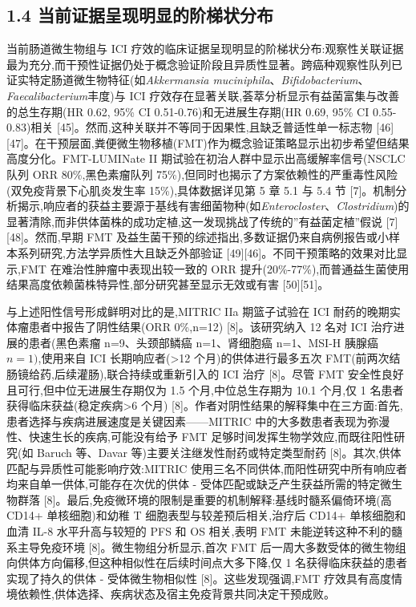 \subsection{1.4 当前证据呈现明显的阶梯状分布}\label{ux5f53ux524dux8bc1ux636eux5448ux73b0ux660eux663eux7684ux9636ux68afux72b6ux5206ux5e03}

当前肠道微生物组与 ICI 疗效的临床证据呈现明显的阶梯状分布:观察性关联证据最为充分,而干预性证据仍处于概念验证阶段且异质性显著。跨癌种观察性队列已证实特定肠道微生物特征(如\emph{Akkermansia muciniphila}、\emph{Bifidobacterium}、\emph{Faecalibacterium}丰度)与 ICI 疗效存在显著关联,荟萃分析显示有益菌富集与改善的总生存期(HR 0.62, 95\% CI 0.51-0.76)和无进展生存期(HR 0.69, 95\% CI 0.55-0.83)相关 {[}45{]}。然而,这种关联并不等同于因果性,且缺乏普适性单一标志物 {[}46{]}{[}47{]}。在干预层面,粪便微生物移植(FMT)作为概念验证策略显示出初步希望但结果高度分化。FMT-LUMINate II 期试验在初治人群中显示出高缓解率信号(NSCLC 队列 ORR 80\%,黑色素瘤队列 75\%),但同时也揭示了方案依赖性的严重毒性风险(双免疫背景下心肌炎发生率 15\%),具体数据详见第 5 章 5.1 与 5.4 节 {[}7{]}。机制分析揭示,响应者的获益主要源于基线有害细菌物种(如\emph{Enterocloster}、\emph{Clostridium})的显著清除,而非供体菌株的成功定植,这一发现挑战了传统的''有益菌定植''假说 {[}7{]}{[}48{]}。然而,早期 FMT 及益生菌干预的综述指出,多数证据仍来自病例报告或小样本系列研究,方法学异质性大且缺乏外部验证 {[}49{]}{[}46{]}。不同干预策略的效果对比显示,FMT 在难治性肿瘤中表现出较一致的 ORR 提升(20\%-77\%),而普通益生菌使用结果高度依赖菌株特异性,部分研究甚至显示无效或有害 {[}50{]}{[}51{]}。

与上述阳性信号形成鲜明对比的是,MITRIC IIa 期篮子试验在 ICI 耐药的晚期实体瘤患者中报告了阴性结果(ORR 0\%,n=12) {[}8{]}。该研究纳入 12 名对 ICI 治疗进展的患者(黑色素瘤 n=9、头颈部鳞癌 n=1、肾细胞癌 n=1、MSI-H 胰腺癌 \(n=1)\),使用来自 ICI 长期响应者(\textgreater12 个月)的供体进行最多五次 FMT(前两次结肠镜给药,后续灌肠),联合持续或重新引入的 ICI 治疗 {[}8{]}。尽管 FMT 安全性良好且可行,但中位无进展生存期仅为 1.5 个月,中位总生存期为 10.1 个月,仅 1 名患者获得临床获益(稳定疾病\textgreater6 个月) {[}8{]}。作者对阴性结果的解释集中在三方面:首先,患者选择与疾病进展速度是关键因素------MITRIC 中的大多数患者表现为弥漫性、快速生长的疾病,可能没有给予 FMT 足够时间发挥生物学效应,而既往阳性研究(如 Baruch 等、Davar 等)主要关注继发性耐药或特定类型耐药 {[}8{]}。其次,供体匹配与异质性可能影响疗效:MITRIC 使用三名不同供体,而阳性研究中所有响应者均来自单一供体,可能存在次优的供体 - 受体匹配或缺乏产生获益所需的特定微生物群落 {[}8{]}。最后,免疫微环境的限制是重要的机制解释:基线时髓系偏倚环境(高 CD14+ 单核细胞)和幼稚 T 细胞表型与较差预后相关,治疗后 CD14+ 单核细胞和血清 IL-8 水平升高与较短的 PFS 和 OS 相关,表明 FMT 未能逆转这种不利的髓系主导免疫环境 {[}8{]}。微生物组分析显示,首次 FMT 后一周大多数受体的微生物组向供体方向偏移,但这种相似性在后续时间点大多下降,仅 1 名获得临床获益的患者实现了持久的供体 - 受体微生物相似性 {[}8{]}。这些发现强调,FMT 疗效具有高度情境依赖性,供体选择、疾病状态及宿主免疫背景共同决定干预成败。


